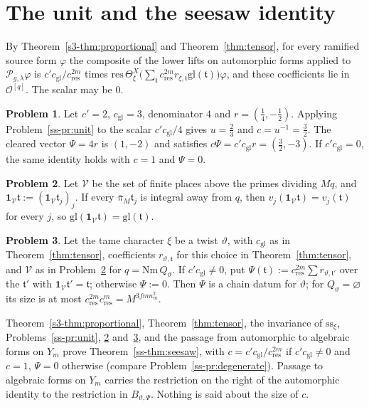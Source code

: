 \documentclass[reqno]{amsart}
\theoremstyle{definition}
\newtheorem{problem}{Problem}[section]
\theoremstyle{plain}
\newcommand{\Oc}{\mathcal{O}}
\newcommand{\Pc}{\mathcal{P}}
\newcommand{\Nm}{\mathrm{Nm}\,}
\newcommand{\gl}{\mathrm{gl}}
\newcommand{\res}{\mathrm{res}}
\newcommand{\ssx}{\mathrm{ss}_\xi}
\newcommand{\cres}{c_{\mathrm{res}}}
\newcommand{\cgl}{c_{\mathrm{gl}}}
\begin{document}
\section{The unit and the seesaw identity}\label{sec:unit}

By Theorem~\ref{s3-thm:proportional} and Theorem~\ref{thm:tensor}, for every ramified source form \(\varphi\) the composite of the lower lifts on automorphic forms applied to \(\Pc_{g,\lambda}\varphi\) is \(c'\cgl/\cres^{2m}\) times \(\res\,\Theta^X_\xi\bigl(\sum_{\mathfrak t}\cres^{2m}r_{\xi,\mathfrak t}\gl(\mathfrak t)\bigr)\varphi\), and these coefficients lie in \(\Oc^{[q]}\).  The scalar may be \(0\).

\begin{problem}\label{pr:unit-check}
Let \(c'=2\), \(\cgl=3\), denominator \(4\) and \(r=(\tfrac14,-\tfrac12)\).  Applying Problem~\ref{ss-pr:unit} to the scalar \(c'\cgl/4\) gives \(u=\tfrac23\) and \(c=u^{-1}=\tfrac32\).  The cleared vector \(\Psi=4r\) is \((1,-2)\) and satisfies \(c\Psi=c'\cgl r=(\tfrac32,-3)\).  If \(c'\cgl=0\), the same identity holds with \(c=1\) and \(\Psi=0\).
\end{problem}

\begin{problem}\label{pr:truncate}
Let \(\mathcal V\) be the set of finite places above the primes dividing \(Mq\), and \(\mathbf 1_{\mathcal V}\mathfrak t:=(\mathbf 1_{\mathcal V}\mathfrak t_j)_j\).  If every \(\bar\pi_M\mathfrak t_j\) is integral away from \(q\), then \(v_j(\mathbf 1_{\mathcal V}\mathfrak t)=v_j(\mathfrak t)\) for every \(j\), so \(\gl(\mathbf 1_{\mathcal V}\mathfrak t)=\gl(\mathfrak t)\).
\end{problem}

\begin{problem}\label{pr:chain-datum}
Let the tame character \(\xi\) be a twist \(\vartheta\), with \(\cgl\) as in Theorem~\ref{thm:tensor}, coefficients \(r_{\vartheta,\mathfrak t}\) for this choice in Theorem~\ref{thm:tensor}, and \(\mathcal V\) as in Problem~\ref{pr:truncate} for \(q=\Nm Q_\vartheta\).  If \(c'\cgl\ne0\), put \(\Psi(\mathfrak t):=\cres^{2m}\sum r_{\vartheta,\mathfrak t'}\) over the \(\mathfrak t'\) with \(\mathbf 1_{\mathcal V}\mathfrak t'=\mathfrak t\); otherwise \(\Psi:=0\).  Then \(\Psi\) is a chain datum for \(\vartheta\); for \(Q_\vartheta=\varnothing\) its size is at most \(\cres^{2m}\cres^{m}=M^{3fmn_m^2}\).
\end{problem}

Theorem~\ref{s3-thm:proportional}, Theorem~\ref{thm:tensor}, the invariance of \(\ssx\), Problems~\ref{ss-pr:unit}, \ref{pr:truncate} and~\ref{pr:chain-datum}, and the passage from automorphic to algebraic forms on \(Y_m\) prove Theorem~\ref{ss-thm:seesaw}, with \(c=c'\cgl/\cres^{2m}\) if \(c'\cgl\ne0\) and \(c=1\), \(\Psi=0\) otherwise (compare Problem~\ref{ss-pr:degenerate}).  Passage to algebraic forms on \(Y_m\) carries the restriction on the right of the automorphic identity to the restriction in \(B_{\vartheta,\Psi}\).  Nothing is said about the size of \(c\).
\end{document}
